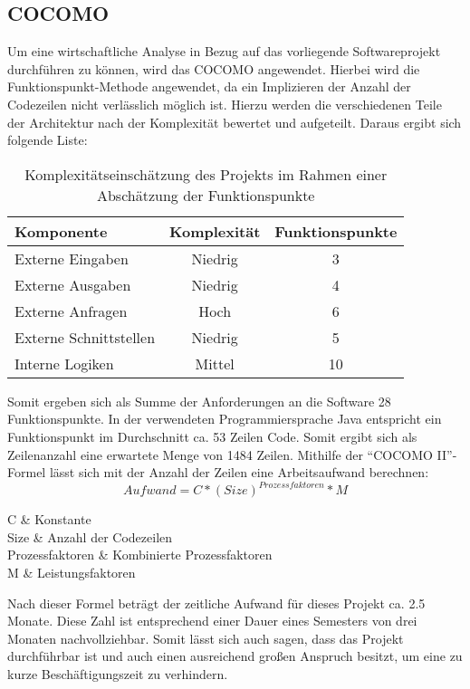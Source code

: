 {	\newpage
	\subsection{COCOMO}
	Um eine wirtschaftliche Analyse in Bezug auf das vorliegende Softwareprojekt durchführen zu können, wird das \ac{COCOMO} angewendet. Hierbei wird die Funktionspunkt-Methode angewendet, da ein Implizieren der Anzahl der Codezeilen nicht verlässlich möglich ist. Hierzu werden die verschiedenen Teile der Architektur nach der Komplexität bewertet und aufgeteilt. Daraus ergibt sich folgende Liste:
	\begin{table}[H]
		\centering
		\footnotesize
	\begin{tabular}{l | c | c}
		\textbf{Komponente} & \textbf{Komplexität} & \textbf{Funktionspunkte} \\ \hline
		Externe Eingaben & Niedrig & 3 \\ \hline
		Externe Ausgaben & Niedrig & 4 \\ \hline
		Externe Anfragen & Hoch & 6 \\ \hline
		Externe Schnittstellen & Niedrig & 5\\ \hline
		Interne Logiken & Mittel & 10\\
	\end{tabular}
	\caption{Komplexitätseinschätzung des Projekts im Rahmen einer Abschätzung der Funktionspunkte}
	\end{table}
	Somit ergeben sich als Summe der Anforderungen an die Software 28 Funktionspunkte. In der verwendeten Programmiersprache Java entspricht ein Funktionspunkt im Durchschnitt ca. 53 Zeilen Code. Somit ergibt sich als Zeilenanzahl eine erwartete Menge von 1484 Zeilen. Mithilfe der ``\ac{COCOMO} II''-Formel lässt sich mit der Anzahl der Zeilen eine Arbeitsaufwand berechnen:
	\begin{equation}\label{cocomo}
		Aufwand = C * (Size)^{Prozessfaktoren} * M
	\end{equation}
	\begin{conditions*}
		C & Konstante\\
		Size & Anzahl der Codezeilen\\
		Prozessfaktoren & Kombinierte Prozessfaktoren\\
		M & Leistungsfaktoren\\
	\end{conditions*}
	Nach dieser Formel beträgt der zeitliche Aufwand für dieses Projekt ca. 2.5 Monate. Diese Zahl ist entsprechend einer Dauer eines Semesters von drei Monaten nachvollziehbar. Somit lässt sich auch sagen, dass das Projekt durchführbar ist und auch einen ausreichend großen Anspruch besitzt, um eine zu kurze Beschäftigungszeit zu verhindern.
}